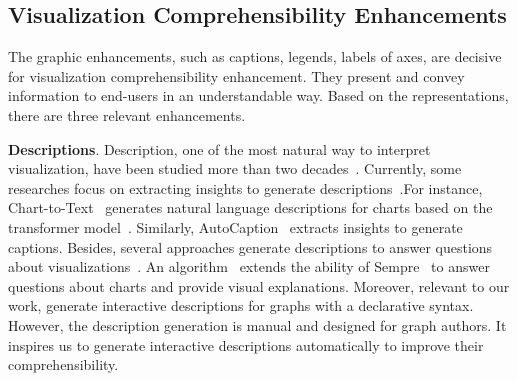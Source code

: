 \subsection{Visualization Comprehensibility Enhancements}

The graphic enhancements, such as captions, legends, labels of axes, are decisive for visualization comprehensibility enhancement. They present and convey information to end-users in an understandable way. Based on the representations, there are three relevant enhancements.

\noindent \textbf{Descriptions}. Description, one of the most natural way to interpret visualization, have been studied more than two decades~\cite{DBLP:journals/coling/MittalMCR98, DBLP:journals/tochi/FerresLST13}. Currently, some researches focus on extracting insights to generate descriptions~\cite{DBLP:conf/inlg/ObeidH20, DBLP:conf/nips/VaswaniSPUJGKP17, DBLP:conf/apvis/LiuXHWY20}.For instance, Chart-to-Text~\cite{DBLP:conf/inlg/ObeidH20} generates natural language descriptions for charts based on the transformer model~\cite{DBLP:conf/nips/VaswaniSPUJGKP17}. Similarly, AutoCaption~\cite{DBLP:conf/apvis/LiuXHWY20} extracts insights to generate captions.
Besides, several approaches generate descriptions to answer questions about visualizations~\cite{DBLP:conf/chi/KimHA20, DBLP:conf/eccv/KembhaviSKSHF16, DBLP:conf/cvpr/KaflePCK18}. An algorithm~\cite{DBLP:conf/chi/KimHA20} extends the ability of Sempre~\cite{DBLP:conf/acl/PasupatL15, DBLP:conf/emnlp/ZhangPL17} to answer questions about charts and provide visual explanations.
Moreover, relevant to our work, \cite{DBLP:conf/vissym/LatifSB19}  generate interactive descriptions for graphs with a declarative syntax. However, the description generation is manual and designed for graph authors. It inspires us to generate interactive descriptions automatically to improve their comprehensibility.


